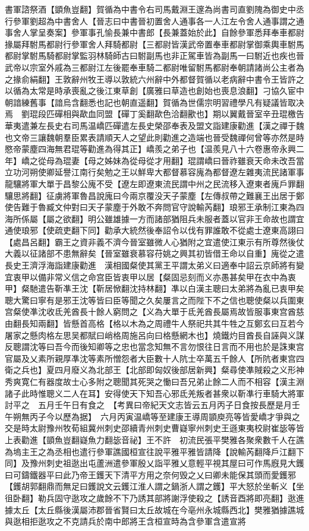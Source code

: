 書軍諮祭酒【顗魚豈翻】賀循為中書令右司馬戴淵王邃為尚書司直劉隗為御史中丞行參軍劉超為中書舍人【晉志曰中書晉初置舍人通事各一人江左令舍人通事謂之通事舍人掌呈奏案】參軍事孔愉長兼中書郎【長兼蓋始於此】自餘參軍悉拜奉車都尉掾屬拜駙馬都尉行參軍舍人拜騎都尉【三都尉皆漢武帝置奉車都尉掌御乘輿車駙馬都尉掌駙馬騎都尉掌監羽林騎師古曰駙副馬也非正駕車皆為副馬一曰駙近也疾也晉武帝以宗室外戚為三都尉江左後罷奉車騎二都尉唯留駙馬都尉奉朝請諸尚公主者為之掾俞絹翻】王敦辭州牧王導以敦統六州辭中外都督賀循以老病辭中書令王皆許之以循為太常是時承喪亂之後江東草創【廣雅曰草造也創始也喪息浪翻】刁協久宦中朝諳練舊事【諳烏含翻悉也記也朝直遥翻】賀循為世儒宗明習禮學凡有疑議皆取决焉　劉琨段匹磾相與歃血同盟【磾丁奚翻歃色洽翻歠也】期以翼戴晉室辛丑琨檄告華夷遣兼左長史右司馬温嶠匹磾遣左長史榮邵奉表及盟文詣建康勸進【漢之禪于魏也文帝三讓魏朝羣臣累表請順天人之望此則勸進之造端也晉受魏禪何曾等亦然是時愍帝蒙塵四海無君琨等勸進為得其正】嶠羨之弟子也【温羨見八十六卷惠帝永興二年】嶠之從母為琨妻【母之姊妹為從母從才用翻】琨謂嶠曰晉祚雖衰天命未改吾當立功河朔使卿延譽江南行矣勉之王以鮮卑大都督慕容廆為都督遼左雜夷流民諸軍事龍驤將軍大單于昌黎公廆不受【遼左即遼東流民謂中州之民流移入遼東者廆戶罪翻驤思將翻】征虜將軍魯昌說廆曰今兩京覆没天子蒙塵【左傳叔帶之難襄王出居于鄭使告難于魯臧文仲對曰天子蒙塵于外敢不奔問官守說輸芮翻】琅邪王承制江東為四海所係屬【屬之欲翻】明公雖雄據一方而諸部猶阻兵未服者蓋以官非王命故也謂宜通使琅邪【使疏吏翻下同】勸承大統然後奉詔令以伐有罪誰敢不從處士遼東高詡曰【處昌呂翻】霸王之資非義不濟今晉室雖微人心猶附之宜遣使江東示有所尊然後仗大義以征諸部不患無辭矣【晉室雖衰慕容苻姚之興其初皆借王命以自重】廆從之遣長史王濟浮海詣建康勸進　漢相國粲使其黨王平謂太弟义曰適奉中詔云京師將有變宜衷甲以備非常义信之命宫臣皆衷甲以居【粲固忌刻而义亦愚甚矣甲在衣中為衷甲】粲馳遣告靳凖王沈【靳居惞翻沈持林翻】凖以白漢主聰曰太弟將為亂已衷甲矣聰大驚曰寧有是邪王沈等皆曰臣等聞之久矣屢言之而陛下不之信也聰使粲以兵圍東宫粲使凖沈收氐羌酋長十餘人窮問之【义為大單于氐羌酋長屬焉故皆服事東宫酋慈由翻長知兩翻】皆懸首高格【格以木為之周禮牛人祭祀共其牛牲之互鄭玄曰互若今屠家之懸肉格左思吴都賦曰峭格周施呂向曰格懸網木也】燒鐵灼目酋長自誣與义謀反聰謂沈等曰吾今而後知卿等之忠也當念知無不言勿恨往日言而不用也於是誅東宫官屬及乂素所親厚凖沈等素所憎怨者大臣數十人阬士卒萬五千餘人【所阬者東宫四衛之兵也】夏四月廢义為北部王【北部即匈奴後部居新興】粲尋使凖賊殺之义形神秀爽寛仁有器度故士心多附之聰聞其死哭之慟曰吾兄弟止餘二人而不相容【漢主淵諸子此時惟聰义二人在耳】安得使天下知吾心邪氐羌叛者甚衆以靳凖行車騎大將軍討平之　五月壬午日有食之　【考異曰帝紀天文志皆云五月丙子日食按長歷是月壬午朔無丙子今以歷為据】　六月丙寅温嶠等至建康王導周顗庾亮等皆愛嶠才爭與之交是時太尉豫州牧荀組冀州刺史邵續青州刺史曹嶷寧州刺史王遜東夷校尉崔毖等皆上表勸進【顗魚豈翻嶷魚力翻毖音祕】王不許　初流民張平樊雅各聚衆數千人在譙為塢主王之為丞相也遣行參軍譙國桓宣往說平雅平雅皆請降【說輸芮翻降戶江翻下同】及豫州刺史祖逖出屯蘆洲遣參軍殷乂詣平雅乂意輕平視其屋曰可作馬廐見大鑊曰可鑄鐵器平曰此乃帝王鑊天下清平方用之奈何毁之乂曰卿未能保其頭而愛鑊邪【鑊胡郭翻鼎而無足曰鑊說文云鑊江淮人謂之鍋浙人謂之鑊】平大怒於坐斬义【坐徂卧翻】勒兵固守逖攻之歲餘不下乃誘其部將謝浮使殺之【誘音酉將即亮翻】逖進據太丘【太丘縣後漢屬沛郡晉省賢曰太丘故城在今亳州永城縣西北】樊雅猶據譙城與逖相拒逖攻之不克請兵於南中郎將王含桓宣時為含參軍含遣宣將